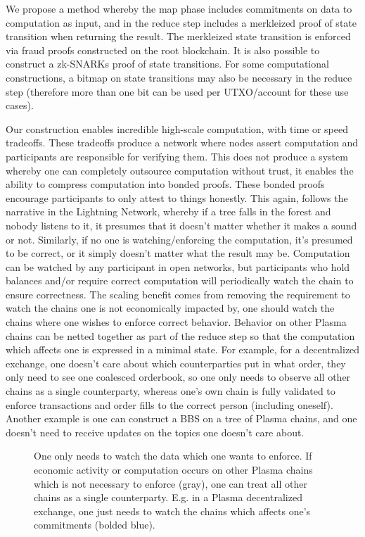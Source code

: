 \documentclass[letterpaper, 11pt]{article}
\begin{document}
We propose a method whereby the map phase includes commitments on data to
computation as input, and in the reduce step includes a merkleized proof of
state transition when returning the result. The merkleized state transition is
enforced via fraud proofs constructed on the root blockchain. It is also
possible to construct a zk-SNARKs proof of state transitions. For some
computational constructions, a bitmap on state transitions may also be
necessary in the reduce step (therefore more than one bit can be used per
UTXO/account for these use cases).

Our construction enables incredible high-scale computation, with time or speed
tradeoffs. These tradeoffs produce a network where nodes assert computation and
participants are responsible for verifying them. This does not produce a system
whereby one can completely outsource computation without trust, it enables the
ability to compress computation into bonded proofs. These bonded proofs
encourage participants to only attest to things honestly. This again, follows
the narrative in the Lightning Network, whereby if a tree falls in the forest
and nobody listens to it, it presumes that it doesn't matter whether it makes a
sound or not. Similarly, if no one is watching/enforcing the computation, it's
presumed to be correct, or it simply doesn't matter what the result may be.
Computation can be watched by any participant in open networks, but participants
who hold balances and/or require correct computation will periodically watch the
chain to ensure correctness. The scaling benefit comes from removing the
requirement to watch the chains one is not economically impacted by, one should
watch the chains where one wishes to enforce correct behavior. Behavior on other
Plasma chains can be netted together as part of the reduce step so that the
computation which affects one is expressed in a minimal state. For example, for
a decentralized exchange, one doesn't care about which counterparties put in
what order, they only need to see one coalesced orderbook, so one only needs to
observe all other chains as a single counterparty, whereas one's own chain is
fully validated to enforce transactions and order fills to the correct person
(including oneself). Another example is one can construct a BBS on a tree of
Plasma chains, and one doesn't need to receive updates on the topics one doesn't
care about.

\begin{figure}[H]
	\caption{
		One only needs to watch the data which one wants to enforce. If
		economic activity or computation occurs on other Plasma chains
		which is not necessary to enforce (gray), one can treat all
		other chains as a single counterparty. E.g. in a Plasma
		decentralized exchange, one just needs to watch the chains which
		affects one's commitments (bolded blue).
		}
\end{figure}
\end{document}
